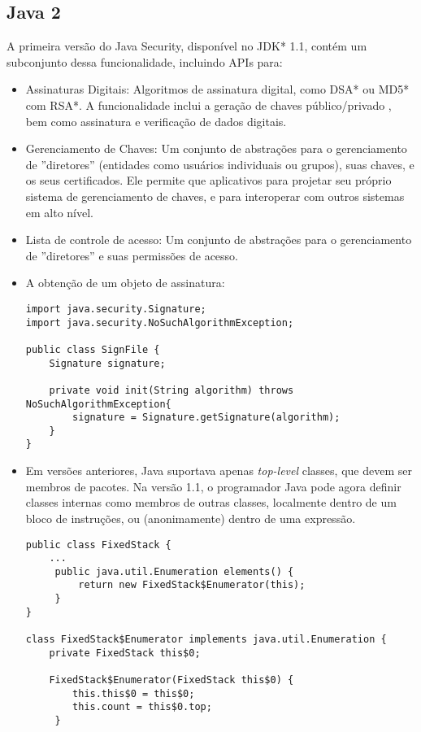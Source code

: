 		\subsection {Java 2}
			A primeira versão do Java Security, disponível no JDK* 1.1, contém um subconjunto dessa funcionalidade, incluindo APIs para:
		  \begin{itemize}
			  \item Assinaturas Digitais: Algoritmos de assinatura digital, como DSA* ou MD5* com RSA*. A funcionalidade inclui a geração de chaves público/privado , bem como assinatura e verificação de dados digitais.
			  \item Gerenciamento de Chaves: Um conjunto de abstrações para o gerenciamento de ''diretores'' (entidades como usuários individuais ou grupos), suas chaves, e os seus certificados. Ele permite que aplicativos para projetar seu próprio sistema de gerenciamento de chaves, e para interoperar com outros sistemas em alto nível.
			  \item Lista de controle de acesso: Um conjunto de abstrações para o gerenciamento de ''diretores'' e suas permissões de acesso.
			  \item A obtenção de um objeto de assinatura: 
			  
\begin{lstlisting}
import java.security.Signature;
import java.security.NoSuchAlgorithmException;
	
public class SignFile {
	Signature signature;
		
	private void init(String algorithm) throws NoSuchAlgorithmException{
		signature = Signature.getSignature(algorithm);
    }
}
\end{lstlisting}
			  
			  \item Em versões anteriores, Java suportava apenas {\it top-level} classes, que devem ser membros de pacotes. Na versão 1.1, o programador Java pode agora definir classes internas como membros de outras classes, localmente dentro de um bloco de instruções, ou (anonimamente) dentro de uma expressão.
		  
\begin{lstlisting}
public class FixedStack {
	...
	 public java.util.Enumeration elements() {
	     return new FixedStack$Enumerator(this);
	 }
}
		
class FixedStack$Enumerator implements java.util.Enumeration {
	private FixedStack this$0;
	
	FixedStack$Enumerator(FixedStack this$0) {
		this.this$0 = this$0;
		this.count = this$0.top;
	 }
			

\end{lstlisting}
\end{itemize}
